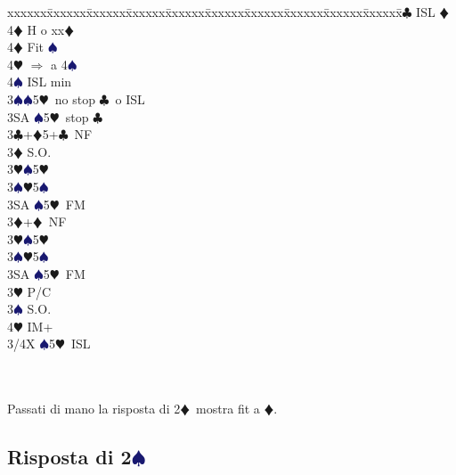 \documentclass[a4paper,italian]{article}
\newcommand{\BC}{\textcolor{OliveGreen}{$\clubsuit$}}
\newcommand{\BD}{\textcolor{RedOrange}{$\vardiamondsuit$}}
\newcommand{\BH}{\textcolor{Red2}{$\varheartsuit${}}}
\newcommand{\BS}{\textcolor{MidnightBlue}{$\spadesuit${}}}
\newcommand{\pdfs}{\texorpdfstring{\BS{}}{S}}
\newenvironment{bidtable}
{\begin{tabbing}

    xxxxxx\=xxxxxx\=xxxxxx\=xxxxxx\=xxxxxx\=xxxxxx\=xxxxxx\=xxxxxx\=xxxxxx\=xxxxxx\=\kill}
{\end{tabbing} }%
\begin{document}
\begin{multicols}{2}
\begin{bidtable}
        4\BC \> ISL \BD \+\\
        4\BD \> H o xx\BD \-\\
        4\BD \> Fit \BS \+\\
        4\BH \> $\Rightarrow$ a 4\BS \+\\
        4\BS \> ISL min\-\-\-\\
        3\BS {}\BS 5\BH\ no stop \BC\ o ISL\\
        3SA \BS 5\BH\ stop \BC \-\\
        3\BC {}+\BD 5+\BC\ NF\+\\
        3\BD \> S.O.\\
        3\BH {}\BS 5\BH \\
        3\BS {}\BH 5\BS \\
        3SA \BS 5\BH\ FM\-\\
        3\BD {}+\BD\ NF\+\\
        3\BH {}\BS 5\BH \\
        3\BS {}\BH 5\BS \\
        3SA \BS 5\BH\ FM\-\\
        3\BH \> P/C\+\\
        3\BS \> S.O.\\
        4\BH \> IM+\\
        3/4X \BS 5\BH\ ISL\-\\
        \\
        \\
    \end{bidtable}
    Passati di mano la risposta di 2\BD\ mostra fit a \BD.
\end{multicols}

\subsection{Risposta di 2\pdfs}
\end{document}
